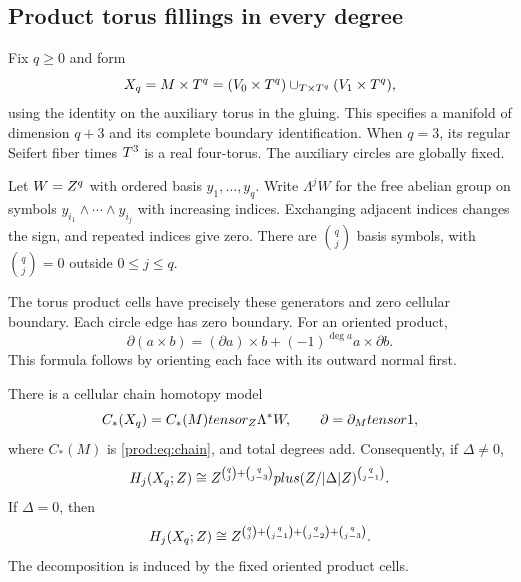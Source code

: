 \subsection{Product torus fillings in every degree}

Fix $q\ge0$ and form
\[
 X_q=M\times T^q
   =(V_0\times T^q)\cup_{T\times T^q}(V_1\times T^q),
\]
using the identity on the auxiliary torus in the gluing.
This specifies a manifold of dimension $q+3$ and its complete boundary
identification.  When $q=3$, its regular Seifert fiber times $T^3$
is a real four-torus.  The auxiliary circles are globally fixed.

Let $W=Z^q$ with ordered basis $y_1,\ldots,y_q$.
Write $\Lambda^j W$ for the free abelian group on symbols
$y_{i_1}\wedge\cdots\wedge y_{i_j}$ with increasing indices.
Exchanging adjacent indices changes the sign, and repeated indices
give zero.  There are $\binom qj$ basis symbols, with
$\binom qj=0$ outside $0\le j\le q$.

The torus product cells have precisely these generators and zero
cellular boundary. Each circle edge has zero boundary.
For an oriented product,
\[
 \partial(a\times b)=(\partial a)\times b+(-1)^{\deg a}a\times\partial b.
\]
This formula follows by orienting each face with its outward normal first.

\begin{theorem}\label{prod:thm:product}
There is a cellular chain homotopy model
\begin{equation}\label{prod:eq:product-chain}
 C_*(X_q)=C_*(M)tensor_{Z}\Lambda^*W,
 \qquad \partial=\partial_Mtensor1,
\end{equation}
where $C_*(M)$ is \eqref{prod:eq:chain}, and total degrees add.
Consequently, if $\Delta\ne0$,
\begin{equation}\label{prod:eq:product-homology}
 H_j(X_q;Z)\cong
 Z^{\binom qj+\binom q{j-3}}
 plus(Z/|\Delta|Z)^{\binom q{j-1}}.
\end{equation}
If $\Delta=0$, then
\begin{equation}\label{prod:eq:product-zero}
 H_j(X_q;Z)\cong
 Z^{\binom qj+\binom q{j-1}+\binom q{j-2}+\binom q{j-3}}.
\end{equation}
The decomposition is induced by the fixed oriented product cells.
\end{theorem}


